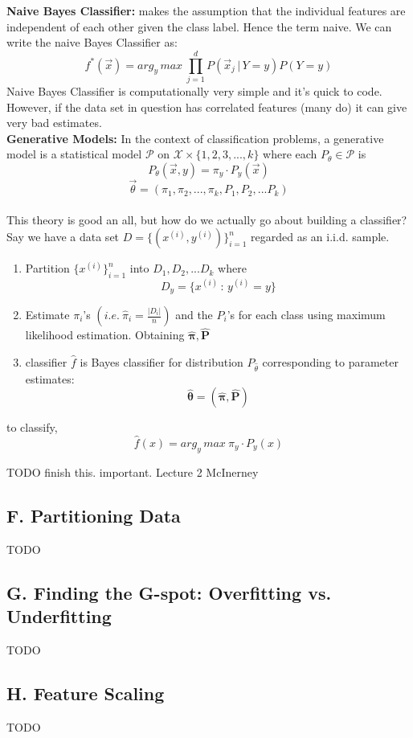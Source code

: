 \documentclass[10pt]{article}
\begin{document}
			\noindent \textbf{Naive Bayes Classifier:} makes the assumption that the individual features 
			are independent of each other given the class label. Hence the term naive. We can write 
			the naive Bayes Classifier as:
			$$ f^*(\vec x) =  arg_y \, max \ \prod_{j=1}^{d}P(\vec x_j \, | \, Y=y)P(Y = y)$$
			Naive Bayes Classifier is computationally very simple and it's quick to code. However, if the data
			set in question has correlated features (many do) it can give very bad estimates. \\
			
			\noindent \textbf{Generative Models:} In the context of classification problems, a generative 
			model is a statistical model $\mathcal P$ on $\mathcal X \times \{1,2,3, ..., k\}$ where each
			$P_\theta \in \mathcal P$ is 
			$$P_\theta(\vec x,y) = \pi_y \cdot P_y(\vec x) $$
			$$ \vec \theta = (\pi_1, \pi_2, ..., \pi_k, P_1, P_2, ...P_k)$$
			\\
			This theory is good an all, but how do we actually go about building a classifier? Say we have
			a data set $D = \{ (x^{(i)}, y^{(i)})\}_{i=1}^n$ regarded as an i.i.d. sample.
			\begin{enumerate}
				\item Partition $\{x^{(i)}\}_{i=1}^{n}$ into $D_1, D_2, ... D_k$ where
				$$ D_y = \{x^{(i)} \, : \, y^{(i)} = y\}$$
				\item Estimate $\pi_i$'s $ (i.e. \ \hat \pi_i = \frac{|D_i|}{n})$ and the $P_i$'s for each class
				using maximum likelihood estimation. Obtaining $\hat{\pmb{\pi}}, \hat{\pmb{P}}$
				\item classifier $\hat f$ is Bayes classifier for distribution $P_{\hat \theta}$ corresponding
				to parameter estimates:
				$$ \hat{\pmb{\theta}} = (\hat{\pmb{\pi}}, \hat{\pmb{P}}) $$
			\end{enumerate}
			
			\noindent to classify,
			$$ \hat{f}(x) = arg_y \, max \ \pi_y \cdot P_y(x)$$
			
			TODO finish this. important. Lecture 2 McInerney 
		\subsection*{F. Partitioning Data}
			TODO
		\subsection*{G. Finding the G-spot: Overfitting vs. Underfitting}
			TODO
		\subsection*{H. Feature Scaling}
			TODO
			
\end{document}
